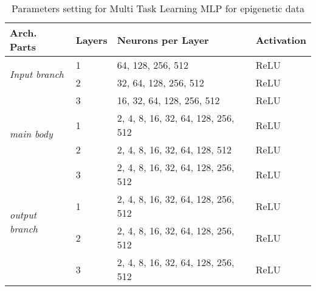 \begin{table}[t]
\centering
\begin{tabular}{llll}
\toprule
\textbf{Arch. Parts} & \textbf{Layers} & \textbf{Neurons per Layer} & \textbf{Activation} \\ 
\midrule
\multirow{2}{*}{\textit{Input branch}}  & 1 & 64, 128, 256, 512 & ReLU \\ 
{} & 2 & 32, 64, 128, 256, 512 & ReLU \\
{} & 3 & 16, 32, 64, 128, 256, 512 & ReLU \\
\midrule
\multirow{2}{*}{\textit{main body}} & 1 & 2, 4, 8, 16, 32, 64, 128, 256, 512 & ReLU \\ 
{} & 2 & 2, 4, 8, 16, 32, 64, 128, 512 & ReLU \\
{} & 3 & 2, 4, 8, 16, 32, 64, 128, 256, 512 & ReLU \\
\midrule
\multirow{2}{*}{\textit{output branch}} & 1 & 2, 4, 8, 16, 32, 64, 128, 256, 512 & ReLU\\ 
{} & 2 & 2, 4, 8, 16, 32, 64, 128, 256, 512 & ReLU \\
{} & 3 & 2, 4, 8, 16, 32, 64, 128, 256, 512 & ReLU \\
\bottomrule
\end{tabular}
\caption{Parameters setting for Multi Task Learning MLP for epigenetic data}
\label{tab:mplmtl}
\end{table}
